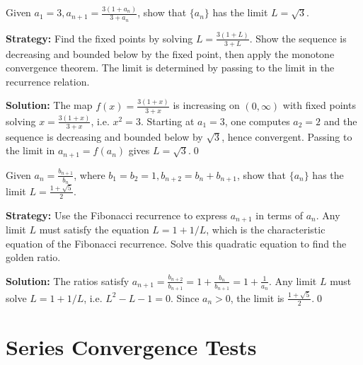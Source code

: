 \begin{problembox}
Given \(a_1 = 3, a_{n+1} = \frac{3(1 + a_n)}{3 + a_n}\), show that \(\{a_n\}\) has the limit \(L = \sqrt{3}\).
\end{problembox}

\noindent\textbf{Strategy:} Find the fixed points by solving \(L=\frac{3(1+L)}{3+L}\). Show the sequence is decreasing and bounded below by the fixed point, then apply the monotone convergence theorem. The limit is determined by passing to the limit in the recurrence relation.

\bigskip\noindent\textbf{Solution:}
The map \(f(x)=\tfrac{3(1+x)}{3+x}\) is increasing on \((0,\infty)\) with fixed points solving \(x=\tfrac{3(1+x)}{3+x}\), i.e. \(x^2=3\). Starting at \(a_1=3\), one computes \(a_2=2\) and the sequence is decreasing and bounded below by \(\sqrt{3}\), hence convergent. Passing to the limit in \(a_{n+1}=f(a_n)\) gives \(L=\sqrt{3}\).\qed


\begin{problembox}
Given \(a_n = \frac{b_{n+1}}{b_n}\), where \(b_1 = b_2 = 1, b_{n+2} = b_n + b_{n+1}\), show that \(\{a_n\}\) has the limit \(L = \frac{1 + \sqrt{5}}{2}\).
\end{problembox}

\noindent\textbf{Strategy:} Use the Fibonacci recurrence to express \(a_{n+1}\) in terms of \(a_n\). Any limit \(L\) must satisfy the equation \(L=1+1/L\), which is the characteristic equation of the Fibonacci recurrence. Solve this quadratic equation to find the golden ratio.

\bigskip\noindent\textbf{Solution:}
The ratios satisfy \(a_{n+1}=\tfrac{b_{n+2}}{b_{n+1}}=1+\tfrac{b_n}{b_{n+1}}=1+\tfrac{1}{a_n}\). Any limit \(L\) must solve \(L=1+1/L\), i.e. \(L^2-L-1=0\). Since \(a_n>0\), the limit is \(\tfrac{1+\sqrt{5}}{2}\).\qed
\section{Series Convergence Tests}



